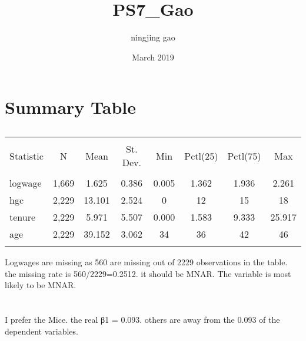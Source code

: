 \documentclass{article}
\title{PS7_Gao}
\author{ningjing gao }
\date{March 2019}
\begin{document}
\maketitle

\section{Summary Table}
\begin{table}[!htbp] \centering 
  \caption{} 
  \label{} 
\begin{tabular}{@{\extracolsep{5pt}}lccccccc} 
\\[-1.8ex]\hline 
\hline \\[-1.8ex] 
Statistic & \multicolumn{1}{c}{N} & \multicolumn{1}{c}{Mean} & \multicolumn{1}{c}{St. Dev.} & \multicolumn{1}{c}{Min} & \multicolumn{1}{c}{Pctl(25)} & \multicolumn{1}{c}{Pctl(75)} & \multicolumn{1}{c}{Max} \\ 
\hline \\[-1.8ex] 
logwage & 1,669 & 1.625 & 0.386 & 0.005 & 1.362 & 1.936 & 2.261 \\ 
hgc & 2,229 & 13.101 & 2.524 & 0 & 12 & 15 & 18 \\ 
tenure & 2,229 & 5.971 & 5.507 & 0.000 & 1.583 & 9.333 & 25.917 \\ 
age & 2,229 & 39.152 & 3.062 & 34 & 36 & 42 & 46 \\ 
\hline \\[-1.8ex] 
\end{tabular} 
\end{table} 

Logwages are missing as 560 are missing out of 2229 observations in the table. the missing rate is 560/2229=0.2512. it should be MNAR. The variable is most likely to be MNAR.


\section{}
I prefer the Mice. the real β1 = 0.093. others are away from the 0.093 of the dependent variables. 
\end{document}
